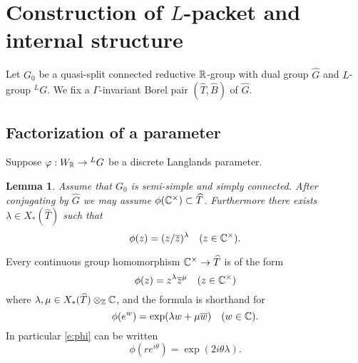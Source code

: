 \documentclass{article}
\newtheorem{lem}[thm]{Lemma}
\theoremstyle{definition}
\numberwithin{equation}{section}
\renewcommand{\-}{\hyp{}}
\begin{document}
\section{Construction of $L$-packet and internal structure}

Let $G_0$ be a quasi-split connected reductive $\mathbb{R}$-group with dual group $\hat G$ and $L$-group $^LG$.
We fix a $\Gamma$-invariant Borel pair $(\hat T,\hat B)$ of $\hat G$.

\subsection{Factorization of a parameter }

Suppose $\varphi : W_{\mathbb{R}} \to {^LG}$ be a discrete Langlands parameter.

\begin{lem} \label{lem:icreg}
Assume that $G_0$ is semi-simple and simply connected. After conjugating by $\hat G$ we may assume $\phi(\mathbb{C}^\times)\subset \widehat T$.
Furthermore there exists $\lambda\in X_*(\hat T)$ such that 
\begin{equation}
\label{e:phi}
\phi(z)=(z/\overline z)^\lambda\quad (z\in \mathbb{C}^\times).
\end{equation}
\end{lem}

Every continuous group homomorphism $\mathbb{C}^\times\rightarrow \widehat T$ is of the form
$$
\phi(z)=z^\lambda\overline z^{\mu}\quad (z\in \mathbb{C}^\times)
$$
where $\lambda,\mu\in X_*(\widehat T)\otimes_{\mathbb{Z}}\mathbb{C}$, and the formula is shorthand for
$$
\phi(e^w)=\exp(\lambda w +\mu\overline w)\quad (w\in \mathbb{C}).
$$
In particular \eqref{e:phi} can be written
$$
\phi(re^{i\theta})=\exp(2i\theta\lambda).
$$
\end{document}

